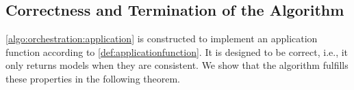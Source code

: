 




\subsection{Correctness and Termination of the Algorithm}

\autoref{algo:orchestration:application} is constructed to implement an application function according to \autoref{def:applicationfunction}.
It is designed to be correct, i.e., it only returns models when they are consistent.
We show that the algorithm fulfills these properties in the following theorem.

